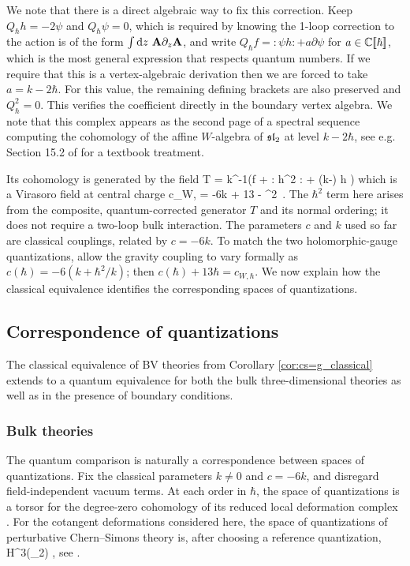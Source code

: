 \documentclass[11pt]{amsart}
\numberwithin{equation}{section}
\numberwithin{figure}{section}
\numberwithin{table}{section}
\begin{document}
We note that there is a direct algebraic way to fix this correction.
Keep $Q_{\hbar}h=-2\psi$ and $Q_{\hbar}\psi=0$, which is required by knowing the 1-loop correction to the action is of the form $\int \mathrm{d} z~\mathbf{A} \partial_z \mathbf{A}$, and write
$Q_{\hbar}f=:\!\psi h\!:+a\partial\psi$ for $a \in {\mathbb C}[\![\hbar]\!]$, which is the most general expression that respects quantum numbers.
If we require that this is a vertex-algebraic derivation then we are forced to take $a=k-2\hbar$.
For this value, the remaining defining brackets are also preserved and $Q_{\hbar}^2=0$.
This verifies the coefficient directly in the boundary vertex algebra.
We note that this complex appears as the second page of a spectral sequence computing the cohomology of the affine $W$-algebra of $\mathfrak{sl}_2$ at level $k - 2 \hbar$, see e.g. Section 15.2 of \cite{FBZ} for a textbook treatment.

Its cohomology is generated by the field
\be
	T = k^{-1}\left(f + :\! h^2 \!: + (k-\hbar) \partial h \right)
\ee
which is a Virasoro field at central charge
\be
	c_{W, \hbar} = -6k + 13 \hbar -  \hbar^2~.
\ee
The $\hbar^2$ term here arises from the composite, quantum-corrected generator $T$ and its normal ordering; it does not require a two-loop bulk interaction.
The parameters $c$ and $k$ used so far are classical couplings, related by $c=-6k$.
To match the two holomorphic-gauge quantizations, allow the gravity coupling to vary formally as $c(\hbar)=-6(k+\hbar^2/k)$; then $c(\hbar)+13\hbar=c_{W,\hbar}$.
We now explain how the classical equivalence identifies the corresponding spaces of quantizations.

\subsection{Correspondence of quantizations}\label{sec:QuantumEquivalence}

The classical equivalence of BV theories from Corollary \ref{cor:cs=g_classical} extends to a quantum equivalence for
both the bulk three-dimensional theories as well as in the presence of boundary conditions.

\subsubsection{Bulk theories}

The quantum comparison is naturally a correspondence between spaces of quantizations.
Fix the classical parameters $k\neq0$ and $c=-6k$, and disregard field-independent vacuum terms.
At each order in $\hbar$, the space of quantizations
is a torsor for the degree-zero cohomology of its reduced local deformation complex
\cite[Ch.~5, Sec.~11]{Costello:2011renormalization}.
For the cotangent deformations considered here, the space of quantizations of perturbative
Chern--Simons theory is, after choosing a reference quantization,
\be\label{eq:QuantumLevelModuli}
 \hbar H^3(\fsl_2)\llbracket\hbar\rrbracket
 \cong\hbar\C\llbracket\hbar\rrbracket,
\ee
see \cite[Ch.~5, Sec.~14]{Costello:2011renormalization}.
\end{document}
